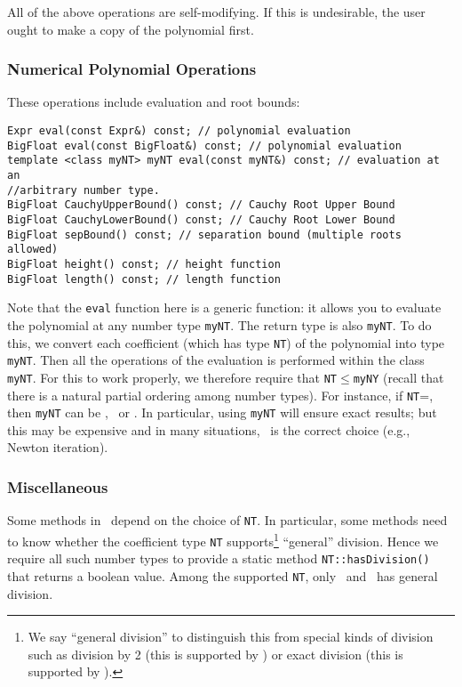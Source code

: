 All of the above operations are self-modifying.  If this
is undesirable, the user ought to make a copy of the polynomial first.

\subsubsection{Numerical Polynomial Operations}

These operations include evaluation and root bounds:

\begin{progb}{
\> \tt  Expr eval(const Expr\&) const;		// polynomial evaluation \\
\> \tt  BigFloat eval(const BigFloat\&) const;	// polynomial evaluation \\
\> \tt  template <class myNT>  myNT eval(const myNT\&) const;
		// evaluation at an\\
\> \>   //arbitrary number type.\\
\> \tt  BigFloat CauchyUpperBound() const;  // Cauchy Root Upper Bound \\
\> \tt  BigFloat CauchyLowerBound() const;  // Cauchy Root Lower Bound \\
\> \tt  BigFloat sepBound() const;	// separation bound (multiple roots allowed) \\
\> \tt  BigFloat height() const;		// height function\\
\> \tt  BigFloat length() const;		// length function\\
}\end{progb}

Note that the {\tt eval} function here is a generic function:
it allows you to evaluate the polynomial at any number type
{\tt myNT}.  The return type is also {\tt myNT}.  To do this,
we convert each coefficient (which has type {\tt NT})
of the polynomial into type {\tt myNT}.  Then all the operations
of the evaluation is performed within the class {\tt myNT}.
For this to work properly, we therefore require that
{\tt NT}$\le${\tt myNY} (recall that there is a natural
partial ordering among number types).   For instance, if {\tt NT}=\BF,
then {\tt myNT} can be \BF, \Rat\ or \expr.   
In particular, using {\tt myNT} will ensure exact results; but this
may be expensive and in many
situations, \BF\ is the correct choice (e.g., Newton iteration).

\subsubsection{Miscellaneous}
Some methods in \Poly\ depend on the choice of {\tt NT}.
In particular, some methods need to know whether the coefficient
type {\tt NT} supports\footnote{
	We say ``general division'' to distinguish
	this from special kinds of division such as
	division by 2 (this is supported by \BF)
	or exact division (this is supported by \Int).
} ``general'' division.  Hence we require all such
number types to provide a static method
	{\tt NT::hasDivision()}
that returns a boolean value.  Among the supported {\tt NT},
only \Rat\ and \expr\ has general division.


